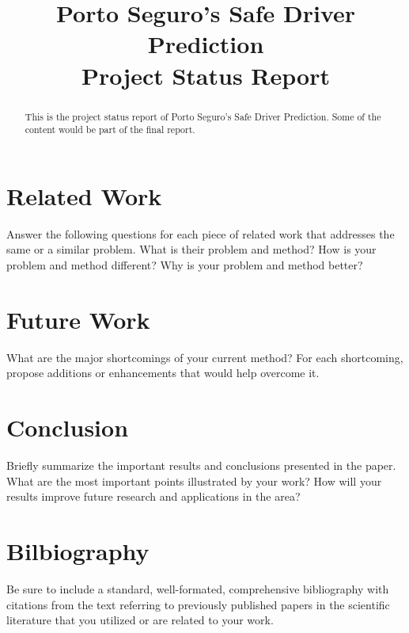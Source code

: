 \documentclass[conference, draftcls,12pt]{IEEEtran}
\begin{document}
\title{Porto Seguro's Safe Driver Prediction\\Project Status Report}
\author{
}

\maketitle

\begin{abstract}
This is the project status report of Porto Seguro's Safe Driver Prediction. Some of the content would be part of the final report.
\end{abstract}









\section{Related Work}

 \scriptsize{
 Answer the following questions for each piece of related work that addresses
 the same or a similar problem. What is their problem and method? How is your
 problem and method different? Why is your problem and method better? 
 }\normalsize

\section{Future Work}

 \scriptsize{
 What are the major shortcomings of your current method? For each shortcoming,
 propose additions or enhancements that would help overcome it. 
 }\normalsize

 \section{Conclusion}

\scriptsize{
 Briefly summarize the important results and conclusions presented in the paper.
 What are the most important points illustrated by your work? How will your
 results improve future research and applications in the area? 
 }\normalsize

\section{Bilbiography}

 \scriptsize{
 Be sure to include a standard, well-formated, comprehensive bibliography with
 citations from the text referring to previously published papers in the
 scientific literature that you utilized or are related to your work.
 }\normalsize


{}

\end{document}
